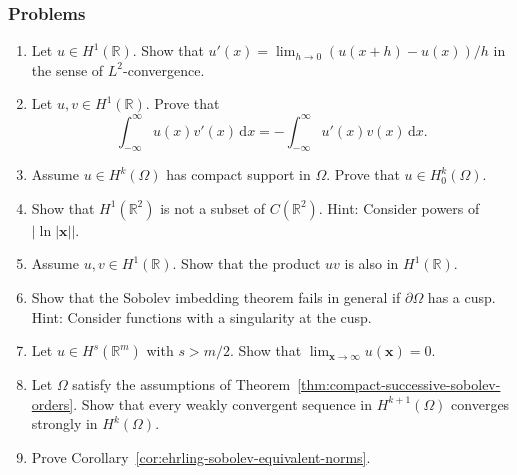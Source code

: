 \subsubsection{Problems}\label{subsec:sobolev-problems}

\begin{enumerate}[label=\thesection.\arabic*.,ref=\thesection.\arabic*,start=1,series=book-problems]

\item\label{ex:sobolev-difference-quotient-l-two-convergence} Let $u\in H^1(\mathbb{R})$. Show that $u'(x)=\lim_{h\to0}(u(x+h)-u(x))/h$ in the sense of $L^2$-convergence.

\item\label{ex:sobolev-line-integration-by-parts} Let $u,v\in H^1(\mathbb{R})$. Prove that\[\int_{-\infty}^{\infty}u(x)v'(x)\,\mathrm{d}x=-\int_{-\infty}^{\infty}u'(x)v(x)\,\mathrm{d}x.\]

\item\label{ex:compact-support-zero-boundary-sobolev} Assume $u\in H^k(\Omega)$ has compact support in $\Omega$. Prove that $u\in H_0^k(\Omega)$.

\item\label{ex:sobolev-embedding-critical-counterexample} Show that $H^1(\mathbb{R}^2)$ is not a subset of $C(\mathbb{R}^2)$. Hint: Consider powers of $|\ln|\bm{x}||$.

\item\label{ex:one-dimensional-h-one-product} Assume $u,v\in H^1(\mathbb{R})$. Show that the product $uv$ is also in $H^1(\mathbb{R})$.

\item\label{ex:sobolev-embedding-cusp-failure} Show that the Sobolev imbedding theorem fails in general if $\partial\Omega$ has a cusp. Hint: Consider functions with a singularity at the cusp.

\item\label{ex:sobolev-continuous-functions-vanish-at-infinity} Let $u\in H^s(\mathbb{R}^m)$ with $s>m/2$. Show that $\lim_{\bm{x}\to\infty}u(\bm{x})=0$.

\item\label{ex:weak-sobolev-convergence-lower-order-strong} Let $\Omega$ satisfy the assumptions of Theorem~\ref{thm:compact-successive-sobolev-orders}. Show that every weakly convergent sequence in $H^{k+1}(\Omega)$ converges strongly in $H^k(\Omega)$.

\item\label{ex:ehrling-sobolev-equivalent-norms} Prove Corollary~\ref{cor:ehrling-sobolev-equivalent-norms}.


\end{enumerate}
